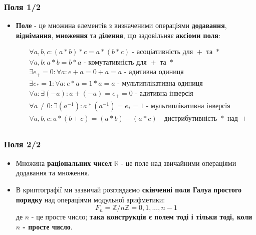 \documentclass{beamer}
\begin{document}
\begin{frame}
  \frametitle{Поля 1/2}
  \begin{itemize}
  \item \textbf{Поле} - це множина елементів з визначеними операціями \textbf{додавання},
    \textbf{віднімання}, \textbf{множення} та \textbf{ділення}, що задовільняє
    \textbf{аксіоми поля}:
    \begin{small}
      \begin{align*}
        &\forall a, b, c: (a * b) * c = a * (b * c) \text{ -
          асоціативність для $+$ та $*$} \\
        &\forall a, b: a * b = b * a \text{ - комутативність для $+$ та
          $*$} \\
        &\exists e_+ = 0: \forall a: e + a = 0 + a = a \text{ - адитивна одиниця} \\
        &\exists e_* = 1: \forall a: e * a = 1 * a = a \text{ - мультиплікативна одиниця} \\
        &\forall a: \exists (-a): a + (-a) = e_+ = 0 \text{ - адитивна інверсія} \\
        &\forall a \neq 0: \exists (a^{-1}): a * (a^{-1}) = e_* = 1 \text{ -
          мультиплікативна інверсія} \\
        &\forall a, b, c: a*(b+c) = (a*b) + (a*c) \text{ - дистрибутивність $*$ над $+$} \\
      \end{align*}
    \end{small}
  \end{itemize}
\end{frame}

\begin{frame}
  \frametitle{Поля 2/2}
  \begin{itemize}
  \item Множина \textbf{раціональних чисел} $\mathbb{R}$ - це поле над
    звичайними операціями додавання та множення.
  \item В криптографії ми зазвичай розглядаємо \textbf{скінченні поля Галуа}
    \textbf{простого порядку} над операціями модульної арифметики:
    $$F_n = \mathbb{Z}/n\mathbb{Z} = {0, 1, ..., n - 1}$$
    де $n$ - це просте число; \textbf{така конструкція є полем тоді і тільки
      тоді, коли $n$ - просте число}.
  \end{itemize}
\end{frame}
\end{document}
